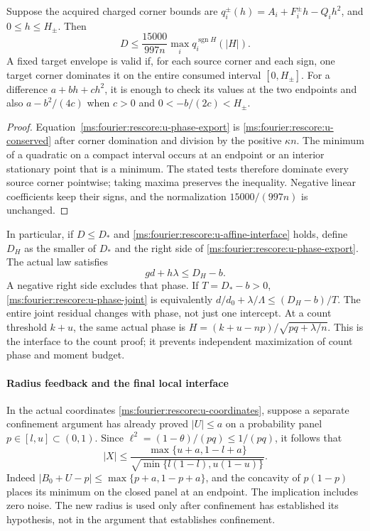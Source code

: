 \begin{lemma}\label{ms:fourier:rescore:u-phase-interface}
Suppose the acquired charged corner bounds are
$q_i^{\pm}(h)=A_i+F_i^{\pm}h-Q_i h^2$, and $0\le h\le H_\pm$.
Then
\begin{equation}\label{ms:fourier:rescore:u-phase-export}
 D\le\frac{15000}{997n}\max_i q_i^{\operatorname{sgn}H}(|H|).
\end{equation}
A fixed target envelope is valid if, for each source corner and each
sign, one target corner dominates it on the entire consumed interval
$[0,H_\pm]$.  For a difference $a+bh+ch^2$, it is enough to check
its values at the two endpoints and also $a-b^2/(4c)$ when $c>0$
and $0<-b/(2c)<H_\pm$.
\end{lemma}
\begin{proof}
Equation~\eqref{ms:fourier:rescore:u-phase-export} is \eqref{ms:fourier:rescore:u-conserved} after
corner domination and division by the positive $\kappa n$.
The minimum of a quadratic on a compact interval occurs at an endpoint
or an interior stationary point that is a minimum.  The stated tests
therefore dominate every source corner pointwise; taking maxima
preserves the inequality.  Negative linear coefficients keep their
signs, and the normalization $15000/(997n)$ is unchanged.
\end{proof}

In particular, if $D\le D_*$ and \eqref{ms:fourier:rescore:u-affine-interface} holds,
define $D_H$ as the smaller of $D_*$ and the right side of
\eqref{ms:fourier:rescore:u-phase-export}.  The actual law satisfies
\begin{equation}\label{ms:fourier:rescore:u-phase-joint}
 g d+h\lambda\le D_H-b.
\end{equation}
A negative right side excludes that phase.  If $T=D_*-b>0$,
\eqref{ms:fourier:rescore:u-phase-joint} is equivalently
$d/d_0+\lambda/\Lambda\le(D_H-b)/T$.
The entire joint residual changes with phase, not just one intercept.
At a count threshold $k+u$, the same actual phase is
$H=(k+u-np)/\sqrt{pq+\lambda/n}$.  This is the interface to the
count proof; it prevents independent maximization of count phase and
moment budget.

\paragraph{Radius feedback and the final local interface}

In the actual coordinates \eqref{ms:fourier:rescore:u-coordinates}, suppose a
separate confinement argument has already proved $|U|\le a$ on a
probability panel $p\in[l,u]\subset(0,1)$. Since
$\ell^2=(1-\theta)/(pq)\le1/(pq)$, it follows that
\begin{equation}\label{ms:fourier:rescore:re-radiusfeedback}
 |X|\le
 \frac{\max\{u+a,1-l+a\}}{\sqrt{\min\{l(1-l),u(1-u)\}}}.
\end{equation}
Indeed $|B_0+U-p|\le\max\{p+a,1-p+a\}$, and the concavity of
$p(1-p)$ places its minimum on the closed panel at an endpoint.
The implication includes zero noise. The new radius is used only
after confinement has established its hypothesis, not in the argument
that establishes confinement.

